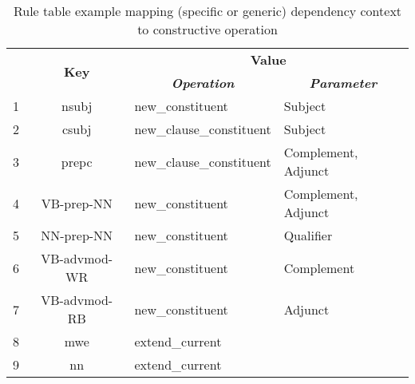 \begin{table}[!ht]
	\centering
	\begin{tabular}{|l|c|l|l|}
		\hline
		\multirow{2}{*}{} & \multirow{2}{*}{\textbf{Key}} & \multicolumn{2}{c|}{\textbf{Value}}                                                                 \\ \cline{3-4} 
		&                               & \multicolumn{1}{c|}{\textit{\textbf{Operation}}} & \multicolumn{1}{c|}{\textit{\textbf{Parameter}}} \\ \hline
		1                 & nsubj                         & new\_constituent                                 & Subject                                          \\ \hline
		2                 & csubj                         & new\_clause\_constituent                         & Subject                                          \\ \hline
		3                 & prepc                         & new\_clause\_constituent                         & Complement, Adjunct                              \\ \hline
		4                 & VB-prep-NN                    & new\_constituent                                 & Complement, Adjunct                              \\ \hline
		5                 & NN-prep-NN                    & new\_constituent                                 & Qualifier                                        \\ \hline
		6                 & VB-advmod-WR                  & new\_constituent                                 & Complement                                       \\ \hline
		7                 & VB-advmod-RB                  & new\_constituent                                 & Adjunct                                          \\ \hline
		8                 & mwe                           & extend\_current                                  &                                                  \\ \hline
		9                 & nn                            & extend\_current                                  &                                                  \\ \hline
	\end{tabular}
	\caption{Rule table example mapping (specific or generic) dependency context to constructive operation}
	\label{tab:rule-table}
\end{table}

